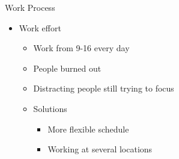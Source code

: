 \begin{frame}{Work Process}
    \begin{itemize}
        \item Work effort
        \begin{itemize}
            \item Work from 9-16 every day
            \item People burned out
            \item Distracting people still trying to focus
            \item Solutions
            \begin{itemize}
                \item More flexible schedule
                \item Working at several locations
            \end{itemize}
        \end{itemize}
    \end{itemize}
\end{frame}